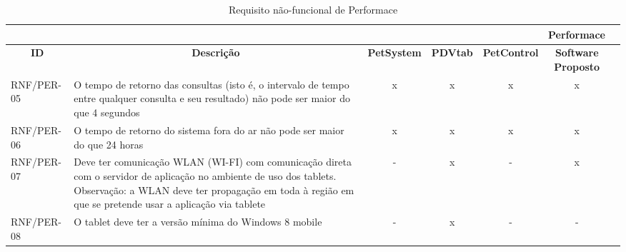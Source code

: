 \documentclass[12pt,openright,twoside,a4paper,english,french,spanish,brazil]{abntex2}
\begin{document}
\begin{landscape}
\begin{table}[!htpb]
\centering
\caption{Requisito não-funcional de Performace}\label{tab:RNF_PERF}%
\begin{small} 
\setlength{\tabcolsep}{3pt}
\begin{tabular}{|p{3cm}|p{}|c|c|c|cc|}
    \toprule
    \multicolumn{6}{r}{\textbf{Performace}} \\
    \midrule
    \multicolumn{1}{c}{\textbf{ID}} & \multicolumn{1}{c}{\textbf{Descrição}} & \multicolumn{1}{c}{\textbf{PetSystem}} & \multicolumn{1}{c}{\textbf{PDVtab}} & \multicolumn{1}{c}{\textbf{PetControl}} & \multicolumn{1}{c}{\textbf{Software Proposto}} \\
    RNF/PER-05 & O tempo de retorno das consultas (isto é, o intervalo de tempo entre qualquer consulta e seu resultado) não pode ser maior do que 4 segundos & x & x & x & x \\
    RNF/PER-06 & O tempo de retorno do sistema fora do ar não pode ser maior do que 24 horas & x & x & x & x \\
    RNF/PER-07 & Deve ter comunicação WLAN (WI-FI) com comunicação direta com o servidor de aplicação no ambiente de uso dos tablets. Observação: a WLAN deve ter propagação em toda à região em que se pretende usar a aplicação via tablete & - & x & - & x \\
    RNF/PER-08 & O tablet deve ter a versão mínima do Windows 8 mobile & - & x & - & - \\
    \bottomrule
\end{tabular}%
\end{small}
\end{table}
\end{landscape}
\newpage
\end{document}
